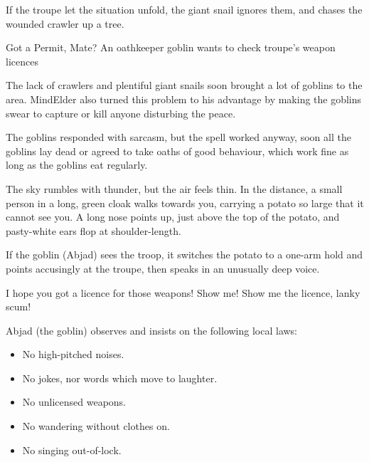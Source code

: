 \giantSnail

\chitincrawler

If the troupe let the situation unfold, the giant snail ignores them, and chases the wounded \gls{crawler} up a tree.

{Got a Permit, Mate?}%
{An oathkeeper goblin wants to check troupe's weapon licences}%


\begin{exampletext}
  The lack of \glspl{crawler} and plentiful giant snails soon brought a lot of goblins to the area.
  \Gls{MindElder} also turned this problem to his advantage by making the goblins swear to capture or kill anyone disturbing the peace.

  The goblins responded with sarcasm, but the spell worked anyway, soon all the goblins lay dead or agreed to take oaths of good behaviour, which work fine as long as the goblins eat regularly.
\end{exampletext}

\begin{boxtext}
  The sky rumbles with thunder, but the air feels thin.
  In the distance, a small person in a long, green cloak walks towards you, carrying a potato so large that it cannot see you.
  A long nose points up, just above the top of the potato, and pasty-white ears flop at shoulder-length.
\end{boxtext}

If the goblin (Abjad) sees the troop, it switches the potato to a one-arm hold and points accusingly at the troupe, then speaks in an unusually deep voice.

\begin{speechtext}
  I hope you got a licence for those weapons!
  Show me!
  Show me the licence, lanky scum!
\end{speechtext}

Abjad (the goblin) observes and insists on the following local laws:

\begin{itemize}
  \item
  No high-pitched noises.
  \item
  No jokes, nor words which move to laughter.
  \item
  No unlicensed weapons.
  \item
  No wandering without clothes on.
  \item
  No singing out-of-lock.
\end{itemize}

